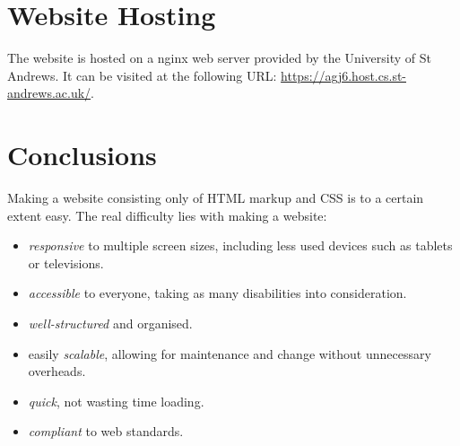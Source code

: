 \documentclass[letterpaper,12pt]{article}
\begin{document}
\section{Website Hosting}
\label{sec:website-hosting}

The website is hosted on a nginx web server provided by the University of St Andrews. It can be visited at the following URL: \url{https://agj6.host.cs.st-andrews.ac.uk/}.

\section{Conclusions}
\label{sec:conclusions}

Making a website consisting only of HTML markup and CSS is to a certain extent easy. The real difficulty lies with making a website:
\begin{itemize}
    \item \textit{responsive} to multiple screen sizes, including less used devices such as tablets or televisions.
    \item \textit{accessible} to everyone, taking as many disabilities into consideration.
    \item \textit{well-structured} and organised.
    \item easily \textit{scalable}, allowing for maintenance and change without unnecessary overheads.
    \item \textit{quick}, not wasting time loading.
    \item \textit{compliant} to web standards.
\end{itemize}

\end{document}
